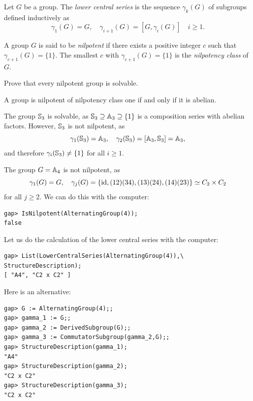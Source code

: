 
\begin{definition}
Let $G$ be a group. The \emph{lower central series} 
is the sequence $\gamma_k(G)$ of subgroups defined inductively 
as 
\[
\gamma_1(G)=G,\quad
\gamma_{i+1}(G)=[G,\gamma_i(G)]\quad i\geq 1.
\]
\end{definition}

\begin{definition}
A group $G$ is said to be \emph{nilpotent} if there exists a positive integer $c$ such that 
$\gamma_{c+1}(G)=\{1\}$. The smallest $c$ with $\gamma_{c+1}(G)=\{1\}$ is 
the \emph{nilpotency class} of $G$.
\end{definition}

\begin{exercise}
\label{xca:nilpotent=>solvable}
Prove that every nilpotent group is solvable. 
\end{exercise}

A group is nilpotent of nilpotency class one if and only if it is abelian. 

\begin{example}
The group $\mathbb{S}_3$ is solvable, as 
$\mathbb{S}_3\supseteq \mathbb{A}_3\supseteq\{1\}$ is a composition series 
with abelian factors. However, $\mathbb{S}_3$ is not nilpotent, as 
\[
\gamma_1(\mathbb{S}_3)=\mathbb{A}_3,\quad
\gamma_2(\mathbb{S}_3)=[\mathbb{A}_3,\mathbb{S}_3]=\mathbb{A}_3, 
\]
and therefore $\gamma_i(\mathbb{S}_3)\ne\{1\}$ for all $i\geq1$. 
\end{example}

\begin{example}
The group $G=\mathbb{A}_4$ is not nilpotent, as 
\[
\gamma_1(G)=G,\quad
\gamma_j(G)=\{\operatorname{id},(12)(34),(13)(24),(14)(23)\}\simeq C_2\times C_2
\]
for all $j\geq2$. We can do this with the computer:
\begin{lstlisting}
gap> IsNilpotent(AlternatingGroup(4));
false
\end{lstlisting}
Let us do the calculation of the lower central series with the computer: 
\begin{lstlisting}
gap> List(LowerCentralSeries(AlternatingGroup(4)),\
StructureDescription);
[ "A4", "C2 x C2" ]
\end{lstlisting}
Here is an alternative:
\begin{lstlisting}
gap> G := AlternatingGroup(4);;
gap> gamma_1 := G;;
gap> gamma_2 := DerivedSubgroup(G);;
gap> gamma_3 := CommutatorSubgroup(gamma_2,G);;
gap> StructureDescription(gamma_1);
"A4"
gap> StructureDescription(gamma_2);
"C2 x C2"
gap> StructureDescription(gamma_3);
"C2 x C2"
\end{lstlisting}
\end{example}

